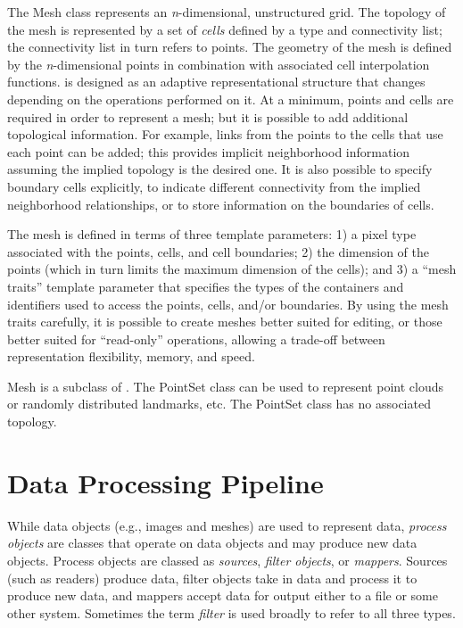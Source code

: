 
The Mesh class represents an \emph{n}-dimensional, unstructured grid. The
topology of the mesh is represented by a set of \emph{cells} defined by a type
and connectivity list; the connectivity list in turn refers to points.  The
geometry of the mesh is defined by the \emph{n}-dimensional points in
combination with associated cell interpolation functions.  is
designed as an adaptive representational structure that changes depending on
the operations performed on it. At a minimum, points and cells are required in
order to represent a mesh; but it is possible to add additional topological
information.  For example, links from the points to the cells that use each
point can be added; this provides implicit neighborhood information assuming
the implied topology is the desired one. It is also possible to specify
boundary cells explicitly, to indicate different connectivity from the implied
neighborhood relationships, or to store information on the boundaries of
cells.

The mesh is defined in terms of three template parameters: 1) a pixel type
associated with the points, cells, and cell boundaries; 2) the dimension of
the points (which in turn limits the maximum dimension of the cells); and 3)
a ``mesh traits'' template parameter that specifies the types of the
containers and identifiers used to access the points, cells, and/or
boundaries. By using the mesh traits carefully, it is possible to create
meshes better suited for editing, or those better suited for ``read-only''
operations, allowing a trade-off between representation flexibility, memory,
and speed.

Mesh is a subclass of . The PointSet
class can be used to represent point clouds or randomly distributed
landmarks, etc. The PointSet class has no associated topology.


\section{Data Processing Pipeline}
\label{sec:DataProcessingPipeline}



While data objects (e.g., images and meshes) are used to represent data,
\emph{process objects} are classes that operate on data objects and may
produce new data objects. Process objects are classed as
\emph{sources}, \emph{filter objects}, or \emph{mappers}.  Sources (such as
readers) produce data, filter objects take in data and process it to produce
new data, and mappers accept data for output either to a file or
some other system.  Sometimes the term \emph{filter} is used broadly
to refer to all three types.

